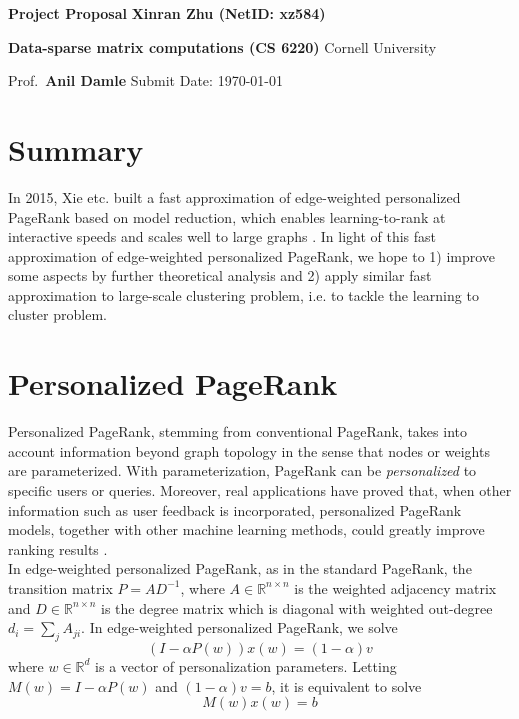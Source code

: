 \documentclass[a4paper, 11pt]{article}
\begin{document}
{\large\textbf{Project Proposal} \hfill \textbf{Xinran Zhu (NetID: xz584)}

\normalsize {\bf Data-sparse matrix computations (CS 6220)
} \hfill Cornell University

Prof.~{\bf Anil Damle} \hfill Submit Date: \today}

\section*{Summary} 
In 2015, Xie etc. built a fast approximation of edge-weighted personalized PageRank based on model reduction, which enables learning-to-rank at interactive speeds and scales well to large graphs \cite{xie2015edge}. In light of this fast approximation of edge-weighted personalized PageRank, we hope to 1) improve some aspects by further theoretical analysis and 2) apply similar fast approximation to large-scale clustering problem, i.e. to tackle the learning to cluster problem. 
	
\section{Personalized PageRank}
Personalized PageRank, stemming from conventional PageRank, takes into account information beyond graph topology in the sense that nodes or weights are parameterized. With parameterization, PageRank can be \emph{personalized} to specific users or queries. Moreover, real applications have proved that, when other information such as user feedback is incorporated, personalized PageRank models, together with other machine learning methods, could greatly improve ranking results \cite{gao2011semi, backstrom2011supervised, nie2005object, feng2012incorporating}.\\

In edge-weighted personalized PageRank, as in the standard PageRank, the transition matrix $P = AD^{-1}$, where $A \in \mathbb{R}^{n\times n}$ is the weighted adjacency matrix and $D\in \mathbb{R}^{n\times n}$ is the degree matrix which is diagonal with weighted out-degree $d_i = \sum_j A_{ji}$. In edge-weighted personalized PageRank, we solve 
\begin{equation}
	(I - \alpha P(w))x(w) = (1-\alpha) v
\end{equation} 
where $w \in \mathbb{R}^{d}$ is a vector of personalization parameters. Letting $M(w) = I - \alpha P(w)$ and $(1-\alpha) v = b$, it is equivalent to solve 
\begin{equation}\label{eq: edge-weighted personalized PR}
	M(w)x(w) = b
\end{equation}
\end{document}
